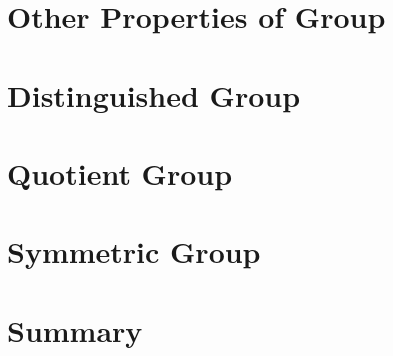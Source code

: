 \documentclass[12pt,openany]{book}
\theoremstyle{definition}
\theoremstyle{definition}
\begin{document}
\chapter{Other Properties of Group}

\chapter{Distinguished Group}

\chapter{Quotient Group}

\chapter{Symmetric Group}

\chapter{Summary}
\end{document}
